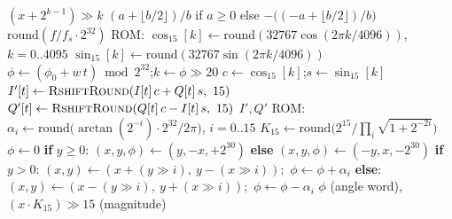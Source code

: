 \begin{algorithm}[H]
\caption{Integer primitives called by Algorithm~\ref{lst:zc_int} (\texttt{ofdm\_phy/fixed/fxp.py}, \texttt{dsp.py}; bit-identical in \texttt{cport/src/}).}
\label{alg:zc_prims}
\begin{algorithmic}[1]
 
    \State \Return $(x + 2^{k-1}) \gg k$
\EndFunction
\Statex
{} 
    \State \Return $(a + \lfloor b/2 \rfloor) / b$ if $a \ge 0$ else $-\big((-a + \lfloor b/2 \rfloor) / b\big)$
\EndFunction
\Statex
{} 
    \State \Return $\mathrm{round}(f / f_s \cdot 2^{32})$
\EndFunction
\Statex
\Function{NcoDerotate}{$I[0..n)$, $Q[0..n)$, $w$, $\phi_0{=}0$} 
    \State ROM: $\cos_{15}[k] \gets \mathrm{round}(32767 \cos(2\pi k/4096))$, $k = 0..4095$ 
    \State \hphantom{ROM:} $\sin_{15}[k] \gets \mathrm{round}(32767 \sin(2\pi k/4096))$
        \State $\phi \gets (\phi_0 + w\, t) \bmod 2^{32}$;\quad $k \gets \phi \gg 20$ 
        \State $c \gets \cos_{15}[k]$;\quad $s \gets \sin_{15}[k]$
        \State $I'[t] \gets \textsc{RshiftRound}(I[t]\, c + Q[t]\, s,\ 15)$ 
        \State $Q'[t] \gets \textsc{RshiftRound}(Q[t]\, c - I[t]\, s,\ 15)$
    \EndFor
    \State \Return $I', Q'$
\EndFunction
\Statex
{} 
    \State ROM: $\alpha_i \gets \mathrm{round}\big(\arctan(2^{-i}) \cdot 2^{32} / 2\pi\big)$, $i = 0..15$ 
    \State \hphantom{ROM:} $K_{15} \gets \mathrm{round}\big(2^{15} \big/ \prod_{i} \sqrt{1 + 2^{-2i}}\big)$ 
    \State $\phi \gets 0$
     
        \State \textbf{if} $y \ge 0$: $(x, y, \phi) \gets (y, -x, +2^{30})$ \textbf{else} $(x, y, \phi) \gets (-y, x, -2^{30})$
    \EndIf
        \State \textbf{if} $y > 0$: $(x, y) \gets (x + (y \gg i),\ y - (x \gg i))$;\ $\phi \gets \phi + \alpha_i$
        \State \textbf{else}: \ $(x, y) \gets (x - (y \gg i),\ y + (x \gg i))$;\ $\phi \gets \phi - \alpha_i$
    \EndFor
    \State \Return $\phi$ (angle word), $(x \cdot K_{15}) \gg 15$ (magnitude)
\EndFunction
\end{algorithmic}
\end{algorithm}

